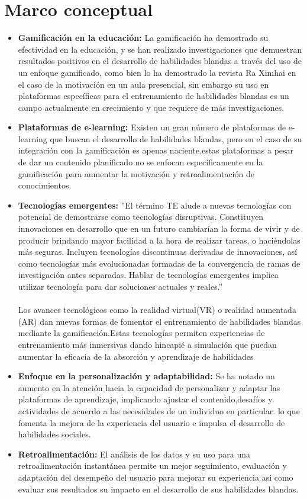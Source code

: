 \section{Marco conceptual}
\begin{itemize}
    
    \item \textbf{Gamificación en la educación:}
    La gamificación ha demostrado su efectividad en la educación, y se han realizado investigaciones que demuestran resultados positivos en el desarrollo de habilidades blandas a través del uso de un enfoque gamificado, como bien lo ha demostrado la revista Ra Ximhai\cite{j} en el caso de la motivación en un aula presencial, sin embargo su uso en  plataformas específicas para el entrenamiento de habilidades blandas es un campo actualmente en crecimiento y que requiere de más investigaciones.
    \item \textbf{Plataformas de e-learning:} Existen un gran número de plataformas de e-learning que buscan el desarrollo de habilidades blandas, pero en el caso de su integración con la gamificación es apenas naciente.estas plataformas a pesar de dar un contenido planificado no se enfocan específicamente en la gamificación para aumentar la motivación y retroalimentación de conocimientos.

    \item \textbf{Tecnologías emergentes:} ”El término TE alude a nuevas tecnologías con potencial de demostrarse como tecnologías disruptivas. Constituyen innovaciones en desarrollo que en un futuro cambiarían la forma de vivir y de producir brindando mayor facilidad a la hora de realizar tareas, o haciéndolas más seguras. Incluyen tecnologías discontinuas derivadas de innovaciones, así como tecnologías más evolucionadas formadas de la convergencia de ramas de investigación antes separadas. Hablar de tecnologías emergentes implica utilizar tecnología para dar soluciones actuales y reales.” \cite{k}
     \\ \\
Los avances tecnológicos como la realidad virtual(VR) o realidad aumentada (AR) dan nuevas formas de fomentar el entrenamiento de habilidades blandas mediante la gamificación.Estas tecnologías permiten experiencias de entrenamiento más inmersivas dando hincapié a simulación que puedan aumentar la eficacia de la absorción y aprendizaje de habilidades

    \item \textbf{Enfoque en la personalización y adaptabilidad:} Se ha notado un aumento en la atención hacia la capacidad de personalizar y adaptar las plataformas de aprendizaje, implicando ajustar el contenido,desafíos y actividades de acuerdo a las necesidades de un individuo en particular. lo que fomenta la mejora de la experiencia del usuario e impulsa el desarrollo de habilidades sociales.
    \item \textbf{Retroalimentación:} El análisis de los datos y su uso para una retroalimentación instantánea permite un mejor seguimiento, evaluación y adaptación del desempeño del usuario para mejorar su experiencia así como evaluar sus resultados su impacto en el desarrollo de sus habilidades blandas.
\end{itemize}


